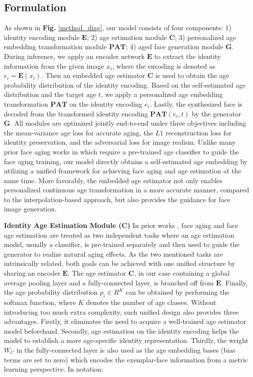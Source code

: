 \documentclass[final]{cvpr}
\begin{document}
\subsection{Formulation}
As shown in \textbf{Fig.} \ref{method_diag}, our model consists of four components: 1) identity encoding module \(\mathbf{E}\); 2) age estimation module \(\mathbf{C}\); 3) personalized age embedding transformation module \(\mathbf{PAT}\); 4) aged face generation module \(\mathbf{G}\). During inference, we apply an encoder network \(\mathbf{E}\) to extract the identity information from the given image \(x_i\), where the encoding is denoted as $e_i = \mathbf{E}(x_i)$. Then an embedded age estimator \(\mathbf{C}\) is used to obtain the age probability distribution of the identity encoding. Based on the self-estimated age distribution and the target age \(t\), we apply a personalized age embedding transformation \(\mathbf{PAT}\) on the identity encoding \(e_i\). Lastly, the synthesized face is decoded from the transformed identity encoding \(\mathbf{PAT}(e_i,t)\) by the generator \(\mathbf{G}\). All modules are optimized jointly end-to-end under three objectives including the mean-variance age loss \cite{pan2018mean} for accurate aging, the \(L1\) reconstruction loss for identity preservation, and the adversarial loss for image realism. Unlike many prior face aging works \cite{wang2018face, he2019s2gan} in which require a pre-trained age classifier to guide the face aging training, our model directly obtains a self-estimated age embedding by utilizing a unified framework for achieving face aging and age estimation at the same time. More favorably, the embedded age estimator not only enables personalized continuous age transformation in a more accurate manner, compared to the interpolation-based approach, but also provides the guidance for face image generation.



\textbf{Identity Age Estimation Module (C)}
In prior works \cite{wang2018face, he2019s2gan}, face aging and face age estimation are treated as two independent tasks where an age estimation model, usually a classifier, is pre-trained separately and then used to guide the generator to realize natural aging effects. As the two mentioned tasks are intrinsically related, both goals can be achieved with one unified structure by sharing an encoder $\mathbf{E}$. The age estimator $\mathbf{C}$, in our case containing a global average pooling layer and a fully-connected layer, is branched off from $\mathbf{E}$. Finally, the age probability distribution \(p_i \in R^K\) can be obtained by performing the softmax function, where \(K\) denotes the number of age classes.
Without introducing too much extra complexity, such unified design also provides three advantages. Firstly, it eliminates the need to acquire a well-trained age estimator model beforehand. Secondly, age estimation on the identity encoding helps the model to establish a more age-specific identity representation. Thirdly, the weight \(W_C\) in the fully-connected layer is also used as the age embedding bases (bias terms are set to zero) which encodes the exemplar-face information from a metric learning perspective. In notation:
\end{document}
